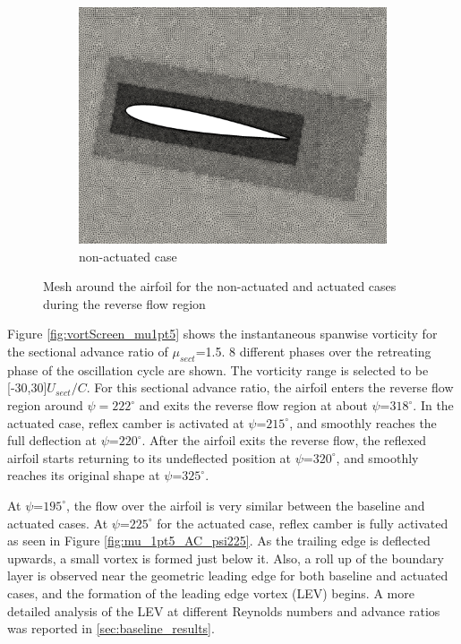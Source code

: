 \begin{figure}[H]
	\centering
	\begin{subfigure}[b]{0.4\textwidth}
		\centering
		\includegraphics[width=1\textwidth]{figures/Setup/mesh}
		\caption{non-actuated case}
		\label{fig:mesh_non-actuated}
	\end{subfigure}
	\caption{Mesh around the airfoil for the non-actuated and actuated cases during the reverse flow region}
	\label{fig:mesh3}
\end{figure}


Figure \ref{fig:vortScreen_mu1pt5} shows the instantaneous spanwise vorticity for the sectional advance ratio of $\mu_{sect}$=1.5.
8 different phases over the retreating phase of the oscillation cycle are shown. The vorticity range is selected to be [-30,30]$ U_{sect}/C$. For this sectional advance ratio, the airfoil enters the reverse flow region around $\psi=222^\circ$ and exits the reverse flow region at about $\psi$=$318^\circ$. In the actuated case, reflex camber is activated at $\psi$=$215^\circ$, and smoothly reaches the full deflection at $\psi$=$220^\circ$. After the airfoil exits the reverse flow, the reflexed airfoil starts returning to its undeflected position at $\psi$=$320^\circ$, and smoothly reaches its original shape at $\psi$=$325^\circ$.


At $\psi$=$195^\circ$, the flow over the airfoil is very similar between the baseline and actuated cases.
At $\psi$=$225^\circ$ for the actuated case, reflex camber is fully activated as seen in Figure \ref{fig:mu_1pt5_AC_psi225}. As the trailing edge is deflected upwards, a small vortex is formed just below it. Also, a roll up of the boundary layer is observed near the geometric leading edge for both baseline and actuated cases, and the formation of the leading edge vortex (LEV) begins. A more detailed analysis of the LEV at different Reynolds numbers and advance ratios was reported in \ref{sec:baseline_results}.

